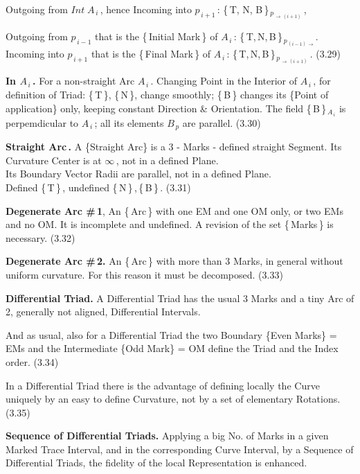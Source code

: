 \documentclass[12pt]{article} %
\begin{document}
\noindent Outgoing from $Int\;A_{\,i}$\,, hence Incoming into $p_{\,i+1}$\,:  \qquad \{\,T, N, B\,\}$_{\,p_{\,\to\,(i+1)}}$\,, 

\noindent Outgoing from $p_{\,i-1}$ that is the \{\,Initial Mark\,\} of $A_{\,i}$\,: \quad \{\,T,\,N,\,B\,\}$_{\,p_{\,(i-1)\,\to}}$\;.\\Incoming into $p_{\,i+1}$ that is the \{\,Final Mark\,\} of $A_{\,i}$\,: \quad \{\,T,\,N,\,B\,\}$_{\,p_{\,\to\,(i+1)}}$\,. \qquad (3.29)

\noindent \textbf{In $A_{\,i}$\,.} For a non-straight Arc $A_{\,i}$\,. Changing Point in the Interior of $A_{\,i}$\,, for definition of Triad:\; \{\,T\,\}, \{\,N\,\}, change smoothly; \{\,B\,\} changes its \{Point of application\} only, keeping constant Direction \& Orientation. The field \{\,B\,\}$_{\,A_{\,i}}$ is perpemdicular to $A_{\,i}$\,; all its elements $B_{\,p}$ are parallel. \qquad (3.30) 

\noindent \textbf{Straight Arc\,.} A \{Straight Arc\} is a 3 - Marks - defined straight Segment. Its Curvature Center is at $\infty$\,, not in a defined Plane.\\ Its Boundary Vector Radii are parallel, not in a defined Plane.\\ Defined \{\,T\,\}\,, undefined \{\,N\,\}\,,\,\{\,B\,\}\,. \qquad (3.31)

\noindent \textbf{Degenerate Arc \#\,1}, An \{\,Arc\,\} with one EM and one OM only, or two EMs and no OM. It is incomplete and undefined. A revision of the set \{\,Marks\,\} is necessary. \qquad \qquad (3.32)

\noindent \textbf{Degenerate Arc \#\,2.} An \{\,Arc\,\} with more than 3 Marks, in general without uniform curvature. For this reason it must be decomposed. (3.33)  

\noindent \textbf{Differential Triad.} A Differential Triad has the usual 3 Marks and a tiny Arc of 2, generally not aligned, Differential Intervals. 

\noindent And as usual, also for a Differential Triad the two Boundary \{Even Marks\} = EMs and the Intermediate \{Odd Mark\} = OM define the Triad and the Index order. \qquad (3.34)

\noindent In a Differential Triad there is the advantage of defining locally the Curve uniquely by an easy to define Curvature, not by a set of elementary Rotations. \qquad (3.35)

\noindent \textbf{Sequence of Differential Triads.} Applying a big No. of Marks in a given Marked Trace Interval, and in the corresponding Curve Interval, by a Sequence of Differential Triads, the fidelity of the local Representation is enhanced.
\end{document}
